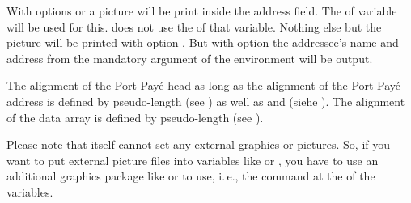 With options
or  a picture will be print inside the address
field. The  of variable  will be used
for this. \KOMAScript{} does not use the  of that
variable. Nothing else but the picture will be printed with option
. But with option
 the addressee's name and address from
the mandatory argument of the  environment will be
output.

The alignment of the Port-Pay\'e head as long as the alignment of the
Port-Pay\'e address is defined by pseudo-length  (see
) as well as
 and  (siehe
). The alignment of
the data array is defined by pseudo-length 
(see ).

Please note that \KOMAScript{} itself cannot set any
external graphics or pictures. So, if you want to put external picture files
into variables like  or , you
have to use an additional graphics package like
 or
 to use, i.\,e., the command
 at the  of the variables.%
%
\EndIndexGroup


